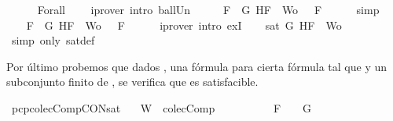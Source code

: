 \begin{isabellebody}
\ \ \ \ \isamarkupfalse%
\ Forall{}\ {}\ {}\ \isamarkupfalse%
\ {\isacharparenleft}iprover\ intro{\isacharcolon}\ ball{\isacharunderscore}Un{\isacharparenright}\isanewline
\ \ \isamarkupfalse%
\ \isamarkupfalse%
\ {\isachardoublequoteopen}{\isasymforall}F\ {\isasymin}\ {\isacharbraceleft}G{\isacharcomma}\isactrlbold {\isasymnot}\ H{\isacharcomma}F{\isacharbraceright}\ {\isasymunion}\ Wo{\isachardot}\ {\isasymA}\ {\isasymTurnstile}\ F{\isachardoublequoteclose}\isanewline
\ \ \ \ \isamarkupfalse%
\ simp\isanewline
\ \ \isamarkupfalse%
\ \isamarkupfalse%
\ {\isachardoublequoteopen}{\isasymexists}{\isasymA}{\isachardot}\ {\isasymforall}F\ {\isasymin}\ {\isacharparenleft}{\isacharbraceleft}G{\isacharcomma}\isactrlbold {\isasymnot}\ H{\isacharcomma}F{\isacharbraceright}\ {\isasymunion}\ Wo{\isacharparenright}{\isachardot}\ {\isasymA}\ {\isasymTurnstile}\ F{\isachardoublequoteclose}\isanewline
\ \ \ \ \isamarkupfalse%
\ {\isacharparenleft}iprover\ intro{\isacharcolon}\ exI{\isacharparenright}\isanewline
\ \ \isamarkupfalse%
\ {\isachardoublequoteopen}sat\ {\isacharparenleft}{\isacharbraceleft}G{\isacharcomma}\isactrlbold {\isasymnot}\ H{\isacharcomma}F{\isacharbraceright}\ {\isasymunion}\ Wo{\isacharparenright}{\isachardoublequoteclose}\isanewline
\ \ \ \ \isamarkupfalse%
\ {\isacharparenleft}simp\ only{\isacharcolon}\ sat{\isacharunderscore}def{\isacharparenright}\isanewline
{}\isamarkupfalse%
%
\endisatagproof
{\isafoldproof}%
%
\isadelimproof
%
\endisadelimproof
%
\begin{isamarkuptext}%
Por último probemos que dados , una fórmula  para cierta fórmula  tal 
  que  y  un subconjunto finito de , se verifica que  es satisfacible.%
\end{isamarkuptext}\isamarkuptrue%
\isamarkupfalse%
\ pcp{\isacharunderscore}colecComp{\isacharunderscore}CON{\isacharunderscore}sat{}{\isacharcolon}\isanewline
\ \ \ {\isachardoublequoteopen}W\ {\isasymin}\ colecComp{\isachardoublequoteclose}\isanewline
\ \ \ \ \ \ \ \ \ \ {\isachardoublequoteopen}F\ {\isacharequal}\ \isactrlbold {\isasymnot}\ {\isacharparenleft}\isactrlbold {\isasymnot}\ G{\isacharparenright}{\isachardoublequoteclose}\isanewline

\end{isabellebody}
